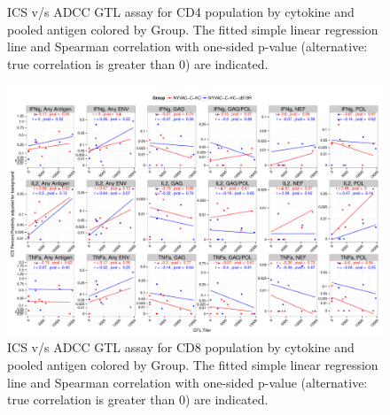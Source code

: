 \documentclass[11pt]{article}\usepackage[]{graphicx}\usepackage[]{color}
\makeatletter
\def\maxwidth{ %
  \ifdim\Gin@nat@width>\linewidth
    \linewidth
  \else
    \Gin@nat@width
  \fi
}
\newenvironment{knitrout}{}{} %
\makeatother
\begin{document}
\begin{landscape}
\begin{figure}[H]
\begin{center}
\begin{knitrout}
\end{knitrout}
\caption{ICS v/s ADCC GTL assay for CD4 population by cytokine and pooled antigen colored by Group. The fitted simple linear regression line and Spearman correlation with one-sided p-value (alternative: true correlation is greater than 0) are indicated.}
\end{center}
\end{figure}


\begin{figure}[H]
\begin{center}
\begin{knitrout}
\color{fgcolor}
\includegraphics[width=\maxwidth]{figure/corrplot_CD8_ADCC_pooledAntigen-1} 

\end{knitrout}
\caption{ICS v/s ADCC GTL assay for CD8 population by cytokine and pooled antigen colored by Group. The fitted simple linear regression line and Spearman correlation with one-sided p-value (alternative: true correlation is greater than 0) are indicated.}
\end{center}
\end{figure}





\end{landscape}
\end{document}
